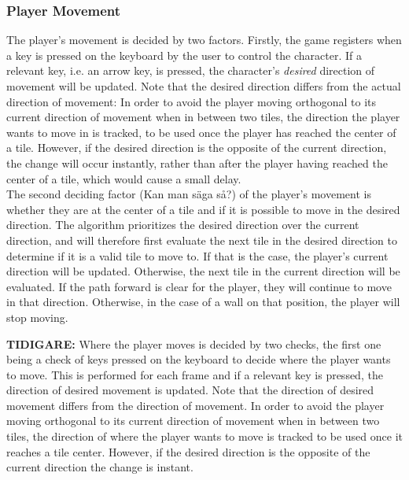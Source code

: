 \documentclass{article}
\begin{document}
  		\subsubsection{Player Movement}
        The player's movement is decided by two factors. Firstly, the game registers when a key is pressed on the keyboard by the user to control the character. If a relevant key, i.e. an arrow key, is pressed, the character's \textit{desired} direction of movement will be updated. Note that the desired direction differs from the actual direction of movement: In order to avoid the player moving orthogonal to its current direction of movement when in between two tiles, the direction the player wants to move in is tracked, to be used once the player has reached the center of a tile. However, if the desired direction is the opposite of the current direction, the change will occur instantly, rather than after the player having reached the center of a tile, which would cause a small delay. \\
        \newline
        The second deciding factor (Kan man säga så?) of the player's movement is whether they are at the center of a tile and if it is possible to move in the desired direction. The algorithm prioritizes the desired direction over the current direction, and will therefore first evaluate the next tile in the desired direction to determine if it is a valid tile to move to. If that is the case, the player's current direction will be updated. Otherwise, the next tile in the current direction will be evaluated. If the path forward is clear for the player, they will continue to move in that direction. Otherwise, in the case of a wall on that position, the player will stop moving. \\
        \newline

		\textbf{TIDIGARE:} Where the player moves is decided by two checks, the first one being a check of keys pressed on the keyboard to decide where the player wants to move. This is performed for each frame and if a relevant key is pressed, the direction of desired movement is updated. Note that the direction of desired movement differs from the direction of movement. In order to avoid the player moving orthogonal to its current direction of movement when in between two tiles, the direction of where the player wants to move is tracked to be used once it reaches a tile center. However, if the desired direction is the opposite of the current direction the change is instant.
\end{document}
